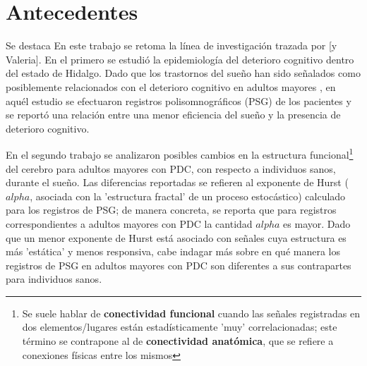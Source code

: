 \documentclass[12pt,a4paper]{mitthesis}
\begin{document}

\setcounter{page}{1}

\chapter{Antecedentes}

Se destaca
En este trabajo se retoma la l\'inea de investigaci\'on trazada por \cite{VazquezTagle16} [y
Valeria]. 
En el primero se estudi\'o la epidemiolog\'ia del deterioro cognitivo dentro del estado de
Hidalgo. Dado que los trastornos del sue\~no han sido se\~nalados como posiblemente relacionados
con el deterioro cognitivo en adultos mayores \cite{Amer13,Miyata13,Potvin12}, en aqu\'el estudio
se efectuaron registros polisomnogr\'aficos (PSG) de los pacientes y se report\'o una relaci\'on
entre una menor eficiencia del sue\~no y la presencia de deterioro cognitivo.

En el segundo trabajo se analizaron posibles cambios en la estructura funcional\footnote{Se suele 
hablar de \textbf{conectividad funcional} cuando las se\~nales registradas en dos elementos/lugares 
est\'an estad\'isticamente 'muy' correlacionadas; este t\'ermino se contrapone al de
\textbf{conectividad anat\'omica}, que se refiere a conexiones f\'isicas entre los mismos} del 
cerebro para adultos mayores con PDC, con respecto a individuos sanos, durante el sue\~no.
Las diferencias reportadas se refieren al exponente de Hurst ($alpha$, asociada con la 'estructura 
fractal' de un proceso estoc\'astico) calculado para los registros de PSG; de manera concreta, se
reporta que para registros correspondientes a adultos mayores con PDC la cantidad $alpha$ es mayor. 
Dado que un menor exponente de Hurst est\'a asociado con se\~nales cuya estructura es m\'as 
'est\'atica' y menos responsiva, cabe indagar m\'as sobre en qu\'e manera los registros de PSG en 
adultos mayores con PDC son diferentes a sus contrapartes para individuos sanos. 
\end{document}
